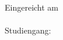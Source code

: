 \begin{titlepage}
\begin{center}
\vfill

{\large
Eingereicht am\\
\tdate\\
\vspace{1.5cm}
Studiengang:\\
\studyprog\\
}
\vfill
\end{center}
\end{titlepage}
\restoregeometry
